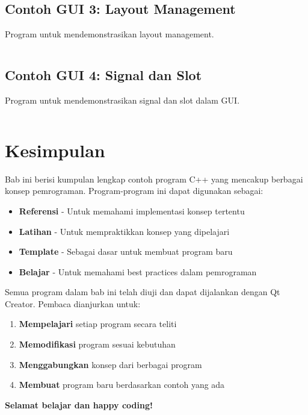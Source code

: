 \subsection{Contoh GUI 3: Layout Management}

Program untuk mendemonstrasikan layout management.

\begin{lstlisting}[language=c++, caption=Layout Management]

\end{lstlisting}

\subsection{Contoh GUI 4: Signal dan Slot}

Program untuk mendemonstrasikan signal dan slot dalam GUI.

\begin{lstlisting}[language=c++, caption=Signal dan Slot dalam GUI]

\end{lstlisting}

\section{Kesimpulan}

Bab ini berisi kumpulan lengkap contoh program C++ yang mencakup berbagai konsep pemrograman. Program-program ini dapat digunakan sebagai:

\begin{itemize}
\item \textbf{Referensi} - Untuk memahami implementasi konsep tertentu
\item \textbf{Latihan} - Untuk mempraktikkan konsep yang dipelajari
\item \textbf{Template} - Sebagai dasar untuk membuat program baru
\item \textbf{Belajar} - Untuk memahami best practices dalam pemrograman
\end{itemize}

Semua program dalam bab ini telah diuji dan dapat dijalankan dengan Qt Creator. Pembaca dianjurkan untuk:

\begin{enumerate}
\item \textbf{Mempelajari} setiap program secara teliti
\item \textbf{Memodifikasi} program sesuai kebutuhan
\item \textbf{Menggabungkan} konsep dari berbagai program
\item \textbf{Membuat} program baru berdasarkan contoh yang ada
\end{enumerate}

\begin{center}
\textbf{Selamat belajar dan happy coding!}
\end{center}